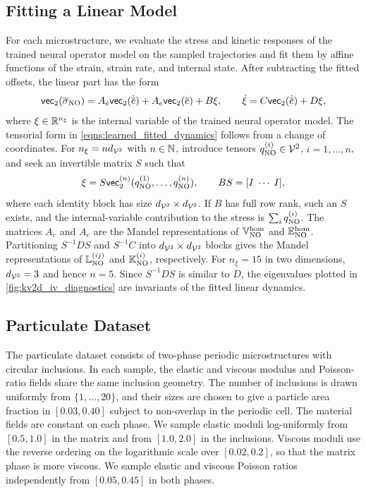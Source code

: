 \subsection{Fitting a Linear Model}\label{app:kv2d_linear_fit}
For each microstructure, we evaluate the stress and kinetic responses of the trained neural operator model on the sampled trajectories and fit them by affine functions of the strain, strain rate, and internal state. After subtracting the fitted offsets, the linear part has the form
\begin{align*}
    \mathsf{vec}_2(\overline{\sigma}_{\rm NO})
    =A_{\dot e}\mathsf{vec}_2(\dot{\overline e})+A_e\mathsf{vec}_2(\overline e)+B\xi,\qquad\dot\xi=C\mathsf{vec}_2(\dot{\overline e})+D\xi,
\end{align*}
where $\xi\in\mathbb{R}^{n_\xi}$ is the internal variable of the trained neural operator model. The tensorial form in \cref{eqns:learned_fitted_dynamics} follows from a change of coordinates. For $n_\xi=nd_{{\mathcal{V}}^2}$ with $n\in\mathbb{N}$, introduce tensors $q_{\rm NO}^{(i)}\in{\mathcal{V}}^2$, $i=1,\dots,n$, and seek an invertible matrix $S$ such that
\begin{equation*}
    \xi=S\mathsf{vec}_2^{(n)}(q_{\rm NO}^{(1)},\dots,q_{\rm NO}^{(n)}),\qquad BS=[I\;\cdots\;I],
\end{equation*}
where each identity block has size $d_{{\mathcal{V}}^2}\times d_{{\mathcal{V}}^2}$. If $B$ has full row rank, such an $S$ exists, and the internal-variable contribution to the stress is $\sum_i q_{\rm NO}^{(i)}$. The matrices $A_{\dot e}$ and $A_e$ are the Mandel representations of $\mathbb{V}^{\rm hom}_{\rm NO}$ and $\mathbb{E}^{\rm hom}_{\rm NO}$. Partitioning $S^{-1}DS$ and $S^{-1}C$ into $d_{{\mathcal{V}}^2}\times d_{{\mathcal{V}}^2}$ blocks gives the Mandel representations of $\mathbb{L}_{\rm NO}^{(ij)}$ and $\mathbb{K}_{\rm NO}^{(i)}$, respectively. For $n_\xi=15$ in two dimensions, $d_{{\mathcal{V}}^2}=3$ and hence $n=5$. Since $S^{-1}DS$ is similar to $D$, the eigenvalues plotted in \cref{fig:kv2d_iv_diagnostics} are invariants of the fitted linear dynamics.


\subsection{Particulate Dataset}\label{app:kv2d_particulate_dataset}

The particulate dataset consists of two-phase periodic microstructures with circular inclusions. In each sample, the elastic and viscous modulus and Poisson-ratio fields share the same inclusion geometry. The number of inclusions is drawn uniformly from $\{1,\dots,20\}$, and their sizes are chosen to give a particle area fraction in $[0.03,0.40]$ subject to non-overlap in the periodic cell. The material fields are constant on each phase. We sample elastic moduli log-uniformly from $[0.5,1.0]$ in the matrix and from $[1.0,2.0]$ in the inclusions. Viscous moduli use the reverse ordering on the logarithmic scale over $[0.02,0.2]$, so that the matrix phase is more viscous. We sample elastic and viscous Poisson ratios independently from $[0.05,0.45]$ in both phases.

